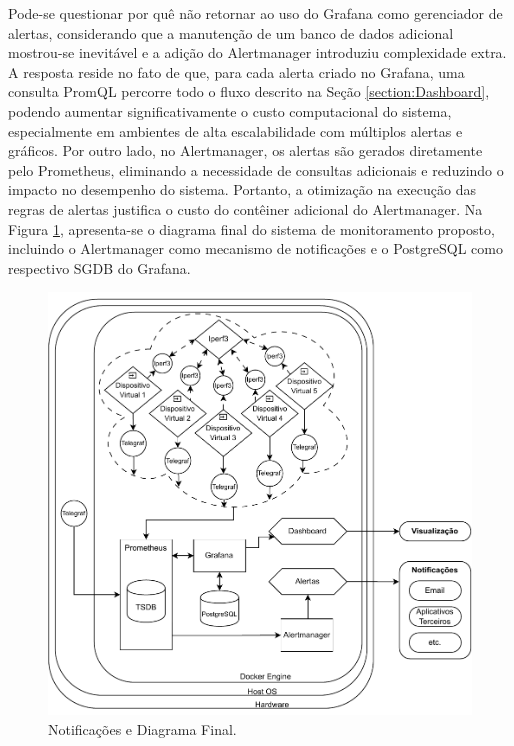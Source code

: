 Pode-se questionar por quê não retornar ao uso do Grafana como gerenciador de alertas, considerando que a manutenção de um banco de dados adicional mostrou-se inevitável e a adição do Alertmanager introduziu complexidade extra. A resposta reside no fato de que, para cada alerta criado no Grafana, uma consulta PromQL percorre todo o fluxo descrito na Seção \ref{section:Dashboard}, podendo aumentar significativamente o custo computacional do sistema, especialmente em ambientes de alta escalabilidade com múltiplos alertas e gráficos. Por outro lado, no Alertmanager, os alertas são gerados diretamente pelo Prometheus, eliminando a necessidade de consultas adicionais e reduzindo o impacto no desempenho do sistema. Portanto, a otimização na execução das regras de alertas justifica o custo do contêiner adicional do Alertmanager. Na Figura \ref{fig:DiagramaAlertas}, apresenta-se o diagrama final do sistema de monitoramento proposto, incluindo o Alertmanager como mecanismo de notificações e o PostgreSQL como respectivo SGDB do Grafana.

\begin{figure}[H]
\centering
\setlength{\abovecaptionskip}{-20pt}
\includegraphics[width=\textwidth]{Imagens/chap04/by-blocks/alerts_diagram.pdf}
\caption{Notificações e Diagrama Final.}
\label{fig:DiagramaAlertas}
\end{figure}

